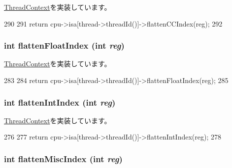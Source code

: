 \hyperlink{classThreadContext_aedffeaa2c4a155d5916a2ae379d77a51}{ThreadContext}を実装しています。


\begin{DoxyCode}
290 {
291     return cpu->isa[thread->threadId()]->flattenCCIndex(reg);
292 }
\end{DoxyCode}
\hypertarget{classO3ThreadContext_ab9ea3f8f1a21df875c7273c7377dfac1}{
\subsubsection[{flattenFloatIndex}]{\setlength{\rightskip}{0pt plus 5cm}int flattenFloatIndex (int {\em reg})}}
\label{classO3ThreadContext_ab9ea3f8f1a21df875c7273c7377dfac1}


\hyperlink{classThreadContext_a7176627444d21b2734a0855b67e6aacf}{ThreadContext}を実装しています。


\begin{DoxyCode}
283 {
284     return cpu->isa[thread->threadId()]->flattenFloatIndex(reg);
285 }
\end{DoxyCode}
\hypertarget{classO3ThreadContext_aa529f2d70520c578e3e29b3bf1a66312}{
\subsubsection[{flattenIntIndex}]{\setlength{\rightskip}{0pt plus 5cm}int flattenIntIndex (int {\em reg})}}
\label{classO3ThreadContext_aa529f2d70520c578e3e29b3bf1a66312}


\hyperlink{classThreadContext_a6940c379416884cb0b9eb04c5193580e}{ThreadContext}を実装しています。


\begin{DoxyCode}
276 {
277     return cpu->isa[thread->threadId()]->flattenIntIndex(reg);
278 }
\end{DoxyCode}
\hypertarget{classO3ThreadContext_a5adc7d32f3a8bd75c5dc0a62d95564fd}{
\subsubsection[{flattenMiscIndex}]{\setlength{\rightskip}{0pt plus 5cm}int flattenMiscIndex (int {\em reg})}}
\label{classO3ThreadContext_a5adc7d32f3a8bd75c5dc0a62d95564fd}


